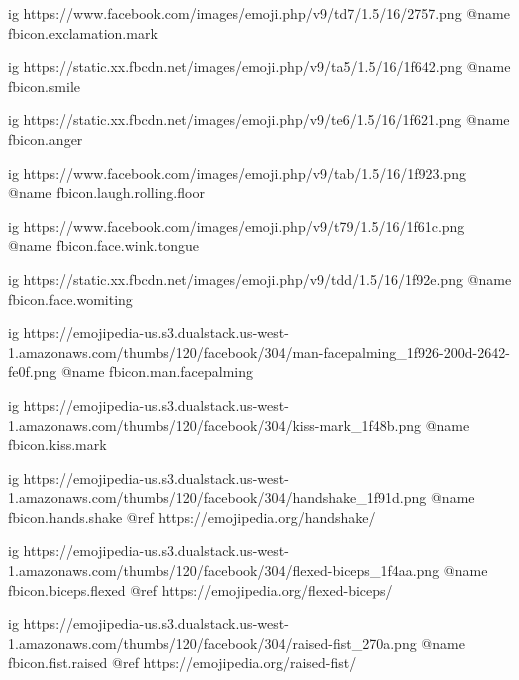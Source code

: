  
 
 
 
 

\ifcmt




  ig https://www.facebook.com/images/emoji.php/v9/td7/1.5/16/2757.png
  @name fbicon.exclamation.mark

  ig https://static.xx.fbcdn.net/images/emoji.php/v9/ta5/1.5/16/1f642.png
  @name fbicon.smile

  ig https://static.xx.fbcdn.net/images/emoji.php/v9/te6/1.5/16/1f621.png
  @name fbicon.anger

  ig https://www.facebook.com/images/emoji.php/v9/tab/1.5/16/1f923.png
  @name fbicon.laugh.rolling.floor

  ig https://www.facebook.com/images/emoji.php/v9/t79/1.5/16/1f61c.png
  @name fbicon.face.wink.tongue

  ig https://static.xx.fbcdn.net/images/emoji.php/v9/tdd/1.5/16/1f92e.png
  @name fbicon.face.womiting

  ig https://emojipedia-us.s3.dualstack.us-west-1.amazonaws.com/thumbs/120/facebook/304/man-facepalming_1f926-200d-2642-fe0f.png
  @name fbicon.man.facepalming

  ig https://emojipedia-us.s3.dualstack.us-west-1.amazonaws.com/thumbs/120/facebook/304/kiss-mark_1f48b.png
  @name fbicon.kiss.mark

  ig https://emojipedia-us.s3.dualstack.us-west-1.amazonaws.com/thumbs/120/facebook/304/handshake_1f91d.png
  @name fbicon.hands.shake
  @ref https://emojipedia.org/handshake/

  ig https://emojipedia-us.s3.dualstack.us-west-1.amazonaws.com/thumbs/120/facebook/304/flexed-biceps_1f4aa.png
  @name fbicon.biceps.flexed
  @ref https://emojipedia.org/flexed-biceps/

  ig https://emojipedia-us.s3.dualstack.us-west-1.amazonaws.com/thumbs/120/facebook/304/raised-fist_270a.png
  @name fbicon.fist.raised
  @ref https://emojipedia.org/raised-fist/

